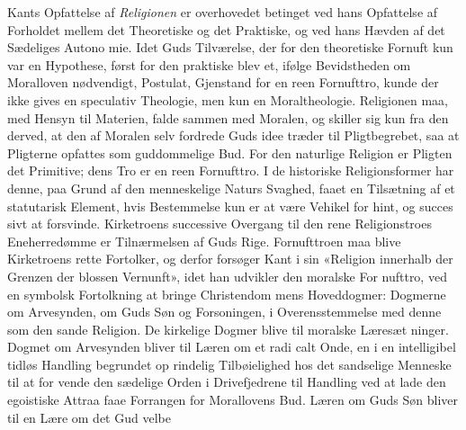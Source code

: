 \documentclass[12pt,a4paper]{book}
\begin{document}
Kants Opfattelse af \emph{Religionen} er overhovedet betinget
ved hans Opfattelse af Forholdet mellem det Theoretiske og
det Praktiske, og ved hans Hævden af det Sædeliges Autono\-%
mie. Idet Guds Tilværelse, der for den theoretiske Fornuft
kun var en Hypothese, først for den praktiske blev et, ifølge
Bevidstheden om Moralloven nødvendigt, Postulat, Gjenstand
for en reen Fornufttro, kunde der ikke gives en speculativ
Theologie, men kun en Moraltheologie. Religionen maa, med
Hensyn til Materien, falde sammen med Moralen, og skiller
sig kun fra den derved, at den af Moralen selv fordrede Guds\-%
idee træder til Pligtbegrebet, saa at Pligterne opfattes som
guddommelige Bud. For den naturlige Religion er Pligten
det Primitive; dens Tro er en reen Fornufttro. I de historiske
Religionsformer har denne, paa Grund af den menneskelige
Naturs Svaghed, faaet en Tilsætning af et statutarisk Element,
hvis Bestemmelse kun er at være Vehikel for hint, og succes\-%
sivt at forsvinde. Kirketroens successive Overgang til den
rene Religionstroes Eneherredømme er Tilnærmelsen af Guds
Rige. Fornufttroen maa blive Kirketroens rette Fortolker, og
derfor forsøger Kant i sin «Religion innerhalb der Grenzen
der blossen Vernunft», idet han udvikler den moralske For\-%
nufttro, ved en symbolsk Fortolkning at bringe Christendom\-%
mens Hoveddogmer: Dogmerne om Arvesynden, om Guds Søn
og Forsoningen, i Overensstemmelse med denne som den sande
Religion. De kirkelige Dogmer blive til moralske Læresæt\-%
ninger. Dogmet om Arvesynden bliver til Læren om et radi\-%
calt Onde, en i en intelligibel tidløs Handling begrundet op\-%
rindelig Tilbøielighed hos det sandselige Menneske til at for\-%
vende den sædelige Orden i Drivefjedrene til Handling ved at
lade den egoistiske Attraa faae Forrangen for Morallovens Bud.
Læren om Guds Søn bliver til en Lære om det Gud velbe\-%
\end{document}
